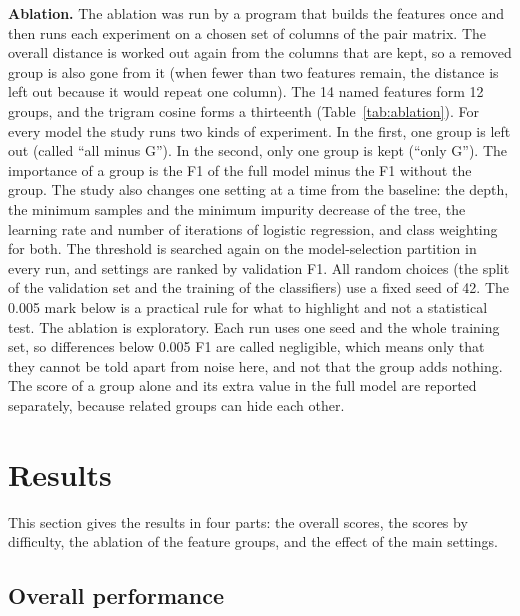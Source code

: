 \documentclass[runningheads]{llncs}
\begin{document}
\textbf{Ablation.} The ablation was run by a program that builds the features once and then runs each experiment on a chosen set of columns of the pair matrix. The overall distance is worked out again from the columns that are kept, so a removed group is also gone from it (when fewer than two features remain, the distance is left out because it would repeat one column). The 14 named features form 12 groups, and the trigram cosine forms a thirteenth (Table~\ref{tab:ablation}). For every model the study runs two kinds of experiment. In the first, one group is left out (called ``all minus G''). In the second, only one group is kept (``only G''). The importance of a group is the F1 of the full model minus the F1 without the group. The study also changes one setting at a time from the baseline: the depth, the minimum samples and the minimum impurity decrease of the tree, the learning rate and number of iterations of logistic regression, and class weighting for both. The threshold is searched again on the model-selection partition in every run, and settings are ranked by validation F1. All random choices (the split of the validation set and the training of the classifiers) use a fixed seed of 42. The 0.005 mark below is a practical rule for what to highlight and not a statistical test. The ablation is exploratory. Each run uses one seed and the whole training set, so differences below 0.005 F1 are called negligible, which means only that they cannot be told apart from noise here, and not that the group adds nothing. The score of a group alone and its extra value in the full model are reported separately, because related groups can hide each other.

\section{Results}
\label{sec:results}

This section gives the results in four parts: the overall scores, the scores by difficulty, the ablation of the feature groups, and the effect of the main settings.

\subsection{Overall performance}
\end{document}
